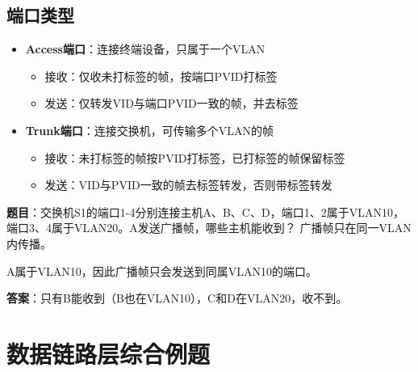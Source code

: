 \subsection{端口类型}
\begin{itemize}[leftmargin=2em,itemsep=0pt]
    \item \textbf{Access端口}：连接终端设备，只属于一个VLAN
    \begin{itemize}[itemsep=0pt]
        \item 接收：仅收未打标签的帧，按端口PVID打标签
        \item 发送：仅转发VID与端口PVID一致的帧，并去标签
    \end{itemize}
    \item \textbf{Trunk端口}：连接交换机，可传输多个VLAN的帧
    \begin{itemize}[itemsep=0pt]
        \item 接收：未打标签的帧按PVID打标签，已打标签的帧保留标签
        \item 发送：VID与PVID一致的帧去标签转发，否则带标签转发
    \end{itemize}
\end{itemize}

\begin{examplebox}[例题3.6 VLAN通信]
\textbf{题目}：交换机S1的端口1-4分别连接主机A、B、C、D，端口1、2属于VLAN10，端口3、4属于VLAN20。A发送广播帧，哪些主机能收到？
\tcblower
广播帧只在同一VLAN内传播。

A属于VLAN10，因此广播帧只会发送到同属VLAN10的端口。

\textbf{答案}：只有B能收到（B也在VLAN10），C和D在VLAN20，收不到。
\end{examplebox}

\section{数据链路层综合例题}

